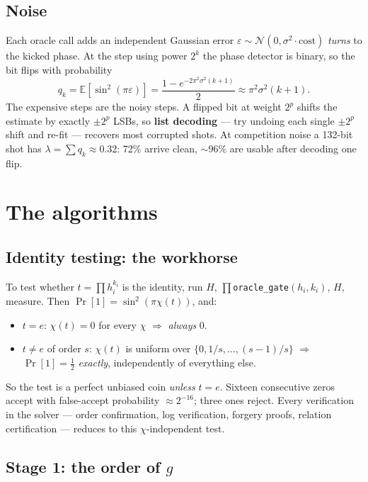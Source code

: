 \documentclass[11pt]{article}
\newcommand{\Exp}{\mathbb{E}}
\theoremstyle{plain}
\theoremstyle{definition}
\begin{document}
\subsection{Noise}

Each oracle call adds an independent Gaussian error
$\varepsilon\sim\mathcal N(0,\sigma^2\cdot\mathrm{cost})$ \emph{turns} to
the kicked phase. At the step using power $2^k$ the phase detector is
binary, so the bit flips with probability
\[
  q_k = \Exp\!\left[\sin^2(\pi\varepsilon)\right]
      = \frac{1-e^{-2\pi^2\sigma^2(k+1)}}{2}
      \approx \pi^2\sigma^2(k+1).
\]
The expensive steps are the noisy steps. A flipped bit at weight $2^p$
shifts the estimate by exactly $\pm 2^p$ LSBs, so \textbf{list decoding}
--- try undoing each single $\pm 2^p$ shift and re-fit --- recovers most
corrupted shots. At competition noise a 132-bit shot has
$\lambda=\sum q_k\approx 0.32$: 72\% arrive clean, $\sim$96\% are usable
after decoding one flip.

\section{The algorithms}

\subsection{Identity testing: the workhorse}

To test whether $t=\prod h_i^{k_i}$ is the identity, run
$H$, $\prod$\texttt{oracle\_gate}$(h_i,k_i)$, $H$, measure. Then
$\Pr[1]=\sin^2(\pi\chi(t))$, and:

\begin{itemize}[nosep]
  \item $t=e$: $\chi(t)=0$ for every $\chi$ $\Rightarrow$ \emph{always} 0.
  \item $t\ne e$ of order $s$: $\chi(t)$ is uniform over
        $\{0,1/s,\dots,(s-1)/s\}$ $\Rightarrow$ $\Pr[1]=\tfrac12$
        \emph{exactly}, independently of everything else.
\end{itemize}

So the test is a perfect unbiased coin \emph{unless} $t=e$. Sixteen
consecutive zeros accept with false-accept probability $\approx2^{-16}$;
three ones reject. Every verification in the solver --- order
confirmation, log verification, forgery proofs, relation certification
--- reduces to this $\chi$-independent test.

\subsection{Stage 1: the order of $g$}
\end{document}
